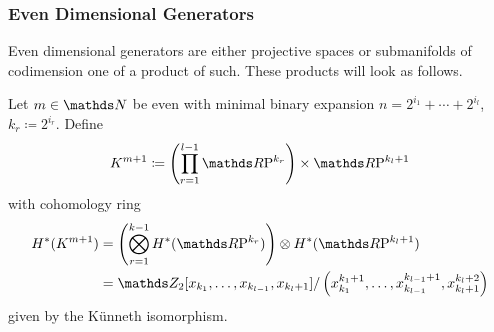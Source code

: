 \subsubsection{Even Dimensional Generators}
Even dimensional generators are either projective spaces or
submanifolds of codimension one of a product of such.
These products will look as follows.
\begin{Def}
  Let $m\in\Nat$ be even with minimal binary expansion
  $n=2^{i_1}+\dotsb+2^{i_l}$, $k_r\coloneqq 2^{i_r}$.
  Define
  \begin{gather*}
    K^{m+1}\coloneqq \left(\prod_{r=1}^{l-1} \RP{k_r}\right) \times \RP{k_l+1}
  \end{gather*}
  with cohomology ring
  \begin{align*}
    \H^*(K^{m+1})
    &= \left(\bigotimes_{r=1}^{k-1}\H^*(\RP{k_r})\right)
      \otimes \H^*(\RP{k_l+1}) \\
    &= \Zmod2[x_{k_1},\dotsc,x_{k_{l-1}}, x_{k_l+1}]/
      \left( x_{k_1}^{k_1+1},\dotsc,x_{k_{l-1}}^{k_{l-1}+1},
      x_{k_l+1}^{k_l+2} \right)
  \end{align*}
  given by the Künneth isomorphism.
\end{Def}

